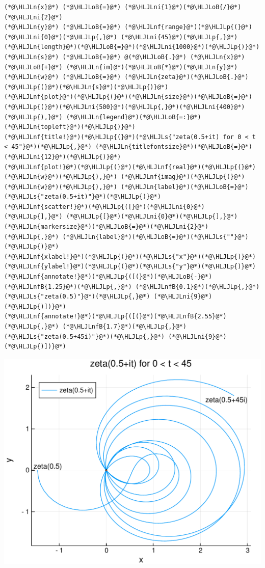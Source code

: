 \documentclass[12pt,a4paper,xelatex,ja=standard]{bxjsarticle}
\newcommand{\HLJLn}[1]{#1}
\newcommand{\HLJLnf}[1]{\textcolor[RGB]{66,102,213}{#1}}
\newcommand{\HLJLs}[1]{\textcolor[RGB]{201,61,57}{#1}}
\newcommand{\HLJLnfB}[1]{\textcolor[RGB]{59,151,46}{#1}}
\newcommand{\HLJLni}[1]{\textcolor[RGB]{59,151,46}{#1}}
\newcommand{\HLJLoB}[1]{\textcolor[RGB]{102,102,102}{\textbf{#1}}}
\newcommand{\HLJLp}[1]{#1}
\begin{document}
\begin{lstlisting}
(*@\HLJLn{x}@*) (*@\HLJLoB{=}@*) (*@\HLJLni{1}@*)(*@\HLJLoB{/}@*)(*@\HLJLni{2}@*)
(*@\HLJLn{y}@*) (*@\HLJLoB{=}@*) (*@\HLJLnf{range}@*)(*@\HLJLp{(}@*)(*@\HLJLni{0}@*)(*@\HLJLp{,}@*) (*@\HLJLni{45}@*)(*@\HLJLp{,}@*) (*@\HLJLn{length}@*)(*@\HLJLoB{=}@*)(*@\HLJLni{1000}@*)(*@\HLJLp{)}@*)
(*@\HLJLn{s}@*) (*@\HLJLoB{=}@*) @(*@\HLJLoB{.}@*) (*@\HLJLn{x}@*) (*@\HLJLoB{+}@*) (*@\HLJLn{im}@*)(*@\HLJLoB{*}@*)(*@\HLJLn{y}@*)
(*@\HLJLn{w}@*) (*@\HLJLoB{=}@*) (*@\HLJLn{zeta}@*)(*@\HLJLoB{.}@*)(*@\HLJLp{(}@*)(*@\HLJLn{s}@*)(*@\HLJLp{)}@*)
(*@\HLJLnf{plot}@*)(*@\HLJLp{(}@*)(*@\HLJLn{size}@*)(*@\HLJLoB{=}@*)(*@\HLJLp{(}@*)(*@\HLJLni{500}@*)(*@\HLJLp{,}@*)(*@\HLJLni{400}@*)(*@\HLJLp{),}@*) (*@\HLJLn{legend}@*)(*@\HLJLoB{=:}@*)(*@\HLJLn{topleft}@*)(*@\HLJLp{)}@*)
(*@\HLJLnf{title!}@*)(*@\HLJLp{(}@*)(*@\HLJLs{"zeta(0.5+it) for 0 < t < 45"}@*)(*@\HLJLp{,}@*) (*@\HLJLn{titlefontsize}@*)(*@\HLJLoB{=}@*)(*@\HLJLni{12}@*)(*@\HLJLp{)}@*)
(*@\HLJLnf{plot!}@*)(*@\HLJLp{(}@*)(*@\HLJLnf{real}@*)(*@\HLJLp{(}@*)(*@\HLJLn{w}@*)(*@\HLJLp{),}@*) (*@\HLJLnf{imag}@*)(*@\HLJLp{(}@*)(*@\HLJLn{w}@*)(*@\HLJLp{),}@*) (*@\HLJLn{label}@*)(*@\HLJLoB{=}@*)(*@\HLJLs{"zeta(0.5+it)"}@*)(*@\HLJLp{)}@*)
(*@\HLJLnf{scatter!}@*)(*@\HLJLp{([}@*)(*@\HLJLni{0}@*)(*@\HLJLp{],}@*) (*@\HLJLp{[}@*)(*@\HLJLni{0}@*)(*@\HLJLp{],}@*) (*@\HLJLn{markersize}@*)(*@\HLJLoB{=}@*)(*@\HLJLni{2}@*)(*@\HLJLp{,}@*) (*@\HLJLn{label}@*)(*@\HLJLoB{=}@*)(*@\HLJLs{""}@*)(*@\HLJLp{)}@*)
(*@\HLJLnf{xlabel!}@*)(*@\HLJLp{(}@*)(*@\HLJLs{"x"}@*)(*@\HLJLp{)}@*)
(*@\HLJLnf{ylabel!}@*)(*@\HLJLp{(}@*)(*@\HLJLs{"y"}@*)(*@\HLJLp{)}@*)
(*@\HLJLnf{annotate!}@*)(*@\HLJLp{([(}@*)(*@\HLJLoB{-}@*)(*@\HLJLnfB{1.25}@*)(*@\HLJLp{,}@*) (*@\HLJLnfB{0.1}@*)(*@\HLJLp{,}@*) (*@\HLJLs{"zeta(0.5)"}@*)(*@\HLJLp{,}@*) (*@\HLJLni{9}@*)(*@\HLJLp{)])}@*)
(*@\HLJLnf{annotate!}@*)(*@\HLJLp{([(}@*)(*@\HLJLnfB{2.55}@*)(*@\HLJLp{,}@*) (*@\HLJLnfB{1.7}@*)(*@\HLJLp{,}@*) (*@\HLJLs{"zeta(0.5+45i)"}@*)(*@\HLJLp{,}@*) (*@\HLJLni{9}@*)(*@\HLJLp{)])}@*)
\end{lstlisting}


\begin{center}
\includegraphics[width=0.8\linewidth]{figures/テスト_8_1.pdf}
\end{center}
\end{document}
